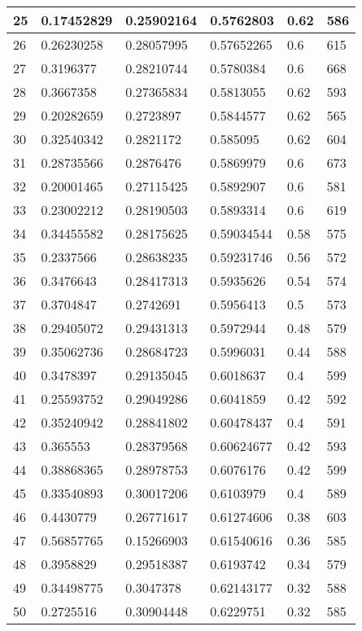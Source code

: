 \begin{longtable}{|l|l|l|l|l|l|}
25 & 0.17452829 & 0.25902164 & 0.5762803 & 0.62 & 586 \\ \hline 
26 & 0.26230258 & 0.28057995 & 0.57652265 & 0.6 & 615 \\ \hline 
27 & 0.3196377 & 0.28210744 & 0.5780384 & 0.6 & 668 \\ \hline 
28 & 0.3667358 & 0.27365834 & 0.5813055 & 0.62 & 593 \\ \hline 
29 & 0.20282659 & 0.2723897 & 0.5844577 & 0.62 & 565 \\ \hline 
30 & 0.32540342 & 0.2821172 & 0.585095 & 0.62 & 604 \\ \hline 
31 & 0.28735566 & 0.2876476 & 0.5869979 & 0.6 & 673 \\ \hline 
32 & 0.20001465 & 0.27115425 & 0.5892907 & 0.6 & 581 \\ \hline 
33 & 0.23002212 & 0.28190503 & 0.5893314 & 0.6 & 619 \\ \hline 
34 & 0.34455582 & 0.28175625 & 0.59034544 & 0.58 & 575 \\ \hline 
35 & 0.2337566 & 0.28638235 & 0.59231746 & 0.56 & 572 \\ \hline 
36 & 0.3476643 & 0.28417313 & 0.5935626 & 0.54 & 574 \\ \hline 
37 & 0.3704847 & 0.2742691 & 0.5956413 & 0.5 & 573 \\ \hline 
38 & 0.29405072 & 0.29431313 & 0.5972944 & 0.48 & 579 \\ \hline 
39 & 0.35062736 & 0.28684723 & 0.5996031 & 0.44 & 588 \\ \hline 
40 & 0.3478397 & 0.29135045 & 0.6018637 & 0.4 & 599 \\ \hline 
41 & 0.25593752 & 0.29049286 & 0.6041859 & 0.42 & 592 \\ \hline 
42 & 0.35240942 & 0.28841802 & 0.60478437 & 0.4 & 591 \\ \hline 
43 & 0.365553 & 0.28379568 & 0.60624677 & 0.42 & 593 \\ \hline 
44 & 0.38868365 & 0.28978753 & 0.6076176 & 0.42 & 599 \\ \hline 
45 & 0.33540893 & 0.30017206 & 0.6103979 & 0.4 & 589 \\ \hline 
46 & 0.4430779 & 0.26771617 & 0.61274606 & 0.38 & 603 \\ \hline 
47 & 0.56857765 & 0.15266903 & 0.61540616 & 0.36 & 585 \\ \hline 
48 & 0.3958829 & 0.29518387 & 0.6193742 & 0.34 & 579 \\ \hline 
49 & 0.34498775 & 0.3047378 & 0.62143177 & 0.32 & 588 \\ \hline 
50 & 0.2725516 & 0.30904448 & 0.6229751 & 0.32 & 585 \\ \hline 
\end{longtable}